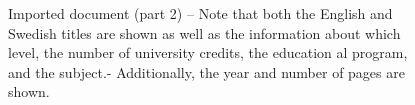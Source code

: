 \begin{figure}[!ht]
  \begin{center}
  \end{center}
  \caption[Imported document (part 2)]{Imported document (part 2) – Note that both the English and Swedish titles are shown as well as the information about which level, the number of university credits, the education al program, and the subject.- Additionally, the year and number of pages are shown.}
  \label{fig:divaImport6}
\end{figure}
\FloatBarrier

